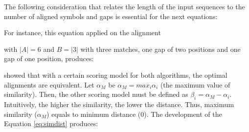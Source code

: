 The following consideration that relates the length of the input sequences to the number of
aligned symbols and gaps is essential for the next equations:

\begin{center}
\end{center}

For instance, this equation applied on the alignment

\begin{center}
\end{center}

with $|A|=6$ and $B=|3|$ with three matches, one gap of two positions and one gap of one position, produces:

\begin{center}
\end{center}

\citet{smith:1981b} showed that with a certain scoring model for both algorithms, the optimal alignments 
are equivalent. Let $\alpha_M$ be $\alpha_M = max_i \alpha_i$ (the maximum value of similarity). Then, 
the other scoring model must be defined as $\beta_i = \alpha_M - \alpha_i$. Intuitively, the higher the 
similarity, the lower the distance. Thus, maximum similarity ($\alpha_M$) equals to minimum distance ($0$). 
The development of the Equation \ref{eq:simdist} produces:


